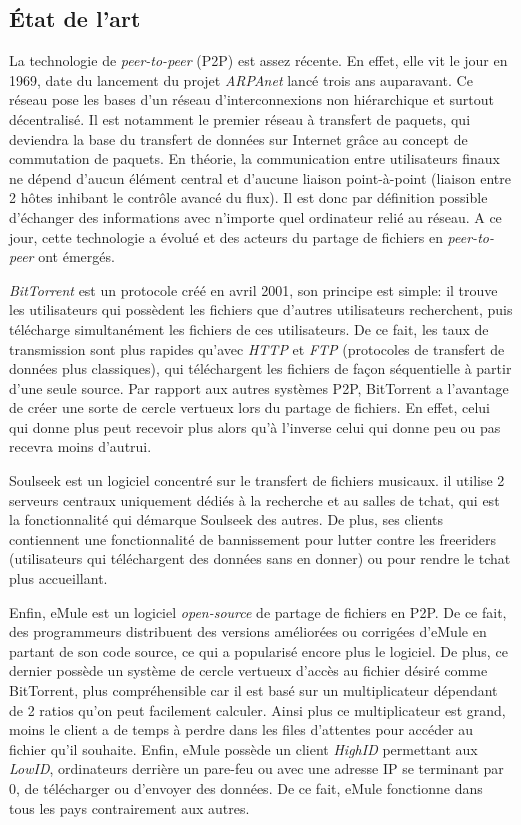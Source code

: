 \documentclass[11pt, a4paper]{specifications}
\begin{document}
    \subsection{État de l'art}
La technologie de \textit{peer-to-peer} (P2P) est assez récente. En effet, elle vit le jour en 1969, date du lancement du projet \textit{ARPAnet} lancé trois ans auparavant. Ce réseau pose les bases d'un réseau d'interconnexions non hiérarchique et surtout décentralisé. Il est notamment le premier réseau à transfert de paquets, qui deviendra la base du transfert de données sur Internet grâce au concept de commutation de paquets. En théorie, la communication entre utilisateurs finaux ne dépend d'aucun élément central et d'aucune liaison \og point-à-point \fg (liaison entre 2 hôtes inhibant le contrôle avancé du flux). Il est donc par définition possible d'échanger des informations avec n'importe quel ordinateur relié au réseau. A ce jour, cette technologie a évolué et des acteurs du partage de fichiers en \textit{peer-to-peer} ont émergés. \newline

\textit{BitTorrent} est un protocole créé en avril 2001, son principe est simple: il trouve les utilisateurs qui possèdent les fichiers que d'autres utilisateurs recherchent, puis télécharge simultanément les fichiers de ces utilisateurs. De ce fait, les taux de transmission sont plus rapides qu'avec \textit{HTTP} et \textit{FTP} (protocoles de transfert de données plus classiques), qui téléchargent les fichiers de façon séquentielle à partir d'une seule source. Par rapport aux autres systèmes P2P, BitTorrent a l'avantage de créer une sorte de cercle vertueux lors du partage de fichiers. En effet, celui qui donne plus peut recevoir plus alors qu'à l'inverse celui qui donne peu ou pas recevra moins d'autrui.\newline

Soulseek est un logiciel concentré sur le transfert de fichiers musicaux. il utilise 2 serveurs centraux uniquement dédiés à la recherche et au salles de tchat, qui est la fonctionnalité qui démarque Soulseek des autres. De plus, ses clients contiennent une fonctionnalité de bannissement pour lutter contre les freeriders (utilisateurs qui téléchargent des données sans en donner) ou pour rendre le tchat plus accueillant.\newline

Enfin, eMule est un logiciel \textit{open-source} de partage de fichiers en P2P. De ce fait, des programmeurs distribuent des versions améliorées ou corrigées d'eMule en partant de son code source, ce qui a popularisé encore plus le logiciel. De plus, ce dernier possède un système de cercle vertueux d'accès au fichier désiré comme BitTorrent, plus compréhensible car il est basé sur un multiplicateur dépendant de 2 ratios qu'on peut facilement calculer. Ainsi plus ce multiplicateur est grand, moins le client a de temps à perdre dans les files d'attentes pour accéder au fichier qu'il souhaite. Enfin, eMule possède un client \textit{HighID} permettant aux \textit{LowID}, ordinateurs derrière un pare-feu ou avec une adresse IP se terminant par 0, de télécharger ou d'envoyer des données. De ce fait, eMule fonctionne dans tous les pays contrairement aux autres.
\end{document}
